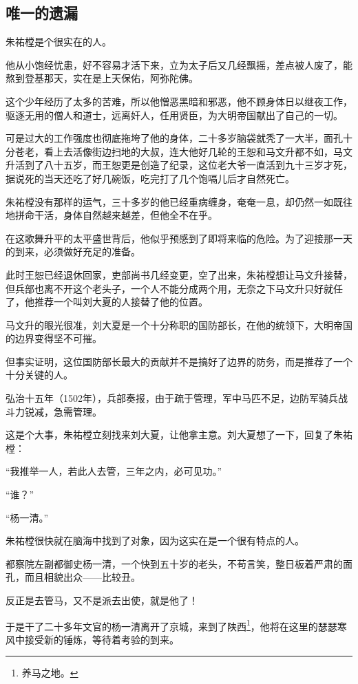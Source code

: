 \begin{multicols}{\theparacolNo}
\subsection{唯一的遗漏}
朱祐樘是个很实在的人。

他从小饱经忧患，好不容易才活下来，立为太子后又几经飘摇，差点被人废了，能熬到登基那天，实在是上天保佑，阿弥陀佛。

这个少年经历了太多的苦难，所以他憎恶黑暗和邪恶，他不顾身体日以继夜工作，驱逐无用的僧人和道士，远离奸人，任用贤臣，为大明帝国献出了自己的一切。

可是过大的工作强度也彻底拖垮了他的身体，二十多岁脑袋就秃了一大半，面孔十分苍老，看上去活像街边扫地的大叔，连大他好几轮的王恕和马文升都不如，马文升活到了八十五岁，而王恕更是创造了纪录，这位老大爷一直活到九十三岁才死，据说死的当天还吃了好几碗饭，吃完打了几个饱嗝儿后才自然死亡。

朱祐樘没有那样的运气，三十多岁的他已经重病缠身，奄奄一息，却仍然一如既往地拼命干活，身体自然越来越差，但他全不在乎。

在这歌舞升平的太平盛世背后，他似乎预感到了即将来临的危险。为了迎接那一天的到来，必须做好充足的准备。

此时王恕已经退休回家，吏部尚书几经变更，空了出来，朱祐樘想让马文升接替，但兵部也离不开这个老头子，一个人不能分成两个用，无奈之下马文升只好就任了，他推荐一个叫刘大夏的人接替了他的位置。

马文升的眼光很准，刘大夏是一个十分称职的国防部长，在他的统领下，大明帝国的边界变得坚不可摧。

但事实证明，这位国防部长最大的贡献并不是搞好了边界的防务，而是推荐了一个十分关键的人。

弘治十五年（1502年），兵部奏报，由于疏于管理，军中马匹不足，边防军骑兵战斗力锐减，急需管理。

这是个大事，朱祐樘立刻找来刘大夏，让他拿主意。刘大夏想了一下，回复了朱祐樘：

“我推举一人，若此人去管，三年之内，必可见功。”

“谁？”

“杨一清。”

朱祐樘很快就在脑海中找到了对象，因为这实在是一个很有特点的人。

都察院左副都御史杨一清，一个快到五十岁的老头，不苟言笑，整日板着严肃的面孔，而且相貌出众——比较丑。

反正是去管马，又不是派去出使，就是他了！

于是干了二十多年文官的杨一清离开了京城，来到了陕西\footnote{养马之地。}，他将在这里的瑟瑟寒风中接受新的锤炼，等待着考验的到来。


\end{multicols}
